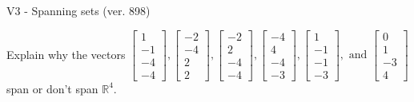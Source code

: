 \begin{exercise}
  \begin{exerciseTitle}V3 - Spanning sets (ver. 898)\end{exerciseTitle}
  \begin{exerciseStatement}
    Explain why the vectors \(\left[\begin{array}{r}
1 \\
-1 \\
-4 \\
-4
\end{array}\right] , \left[\begin{array}{r}
-2 \\
-4 \\
2 \\
2
\end{array}\right] , \left[\begin{array}{r}
-2 \\
2 \\
-4 \\
-4
\end{array}\right] , \left[\begin{array}{r}
-4 \\
4 \\
-4 \\
-3
\end{array}\right] , \left[\begin{array}{r}
1 \\
-1 \\
-1 \\
-3
\end{array}\right] , \text{ and } \left[\begin{array}{r}
0 \\
1 \\
-3 \\
4
\end{array}\right]\) span or don't span \(\mathbb{R}^4\). 
	



\end{exerciseStatement}
\end{exercise}
